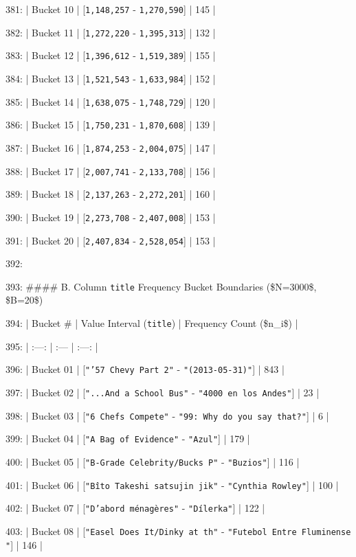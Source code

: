 \documentclass[11pt,a4paper]{article}
\begin{document}
381: | Bucket 10 | [\texttt{1,148,257} - \texttt{1,270,590}] | 145 |

382: | Bucket 11 | [\texttt{1,272,220} - \texttt{1,395,313}] | 132 |

383: | Bucket 12 | [\texttt{1,396,612} - \texttt{1,519,389}] | 155 |

384: | Bucket 13 | [\texttt{1,521,543} - \texttt{1,633,984}] | 152 |

385: | Bucket 14 | [\texttt{1,638,075} - \texttt{1,748,729}] | 120 |

386: | Bucket 15 | [\texttt{1,750,231} - \texttt{1,870,608}] | 139 |

387: | Bucket 16 | [\texttt{1,874,253} - \texttt{2,004,075}] | 147 |

388: | Bucket 17 | [\texttt{2,007,741} - \texttt{2,133,708}] | 156 |

389: | Bucket 18 | [\texttt{2,137,263} - \texttt{2,272,201}] | 160 |

390: | Bucket 19 | [\texttt{2,273,708} - \texttt{2,407,008}] | 153 |

391: | Bucket 20 | [\texttt{2,407,834} - \texttt{2,528,054}] | 153 |

392:

393: \#\#\#\# B. Column \texttt{title} Frequency Bucket Boundaries (\$N=3000\$, \$B=20\$)

394: | Bucket \# | Value Interval (\texttt{title}) | Frequency Count (\$n\_i\$) |

395: | :---: | :--- | :---: |

396: | Bucket 01 | [\texttt{"'57 Chevy Part 2"} - \texttt{"(2013-05-31)"}] | 843 |

397: | Bucket 02 | [\texttt{"...And a School Bus"} - \texttt{"4000 en los Andes"}] | 23 |

398: | Bucket 03 | [\texttt{"6 Chefs Compete"} - \texttt{"99: Why do you say that?"}] | 6 |

399: | Bucket 04 | [\texttt{"A Bag of Evidence"} - \texttt{"Azul"}] | 179 |

400: | Bucket 05 | [\texttt{"B-Grade Celebrity/Bucks P"} - \texttt{"Buzios"}] | 116 |

401: | Bucket 06 | [\texttt{"Bîto Takeshi satsujin jik"} - \texttt{"Cynthia Rowley"}] | 100 |

402: | Bucket 07 | [\texttt{"D'abord ménagères"} - \texttt{"Dílerka"}] | 122 |

403: | Bucket 08 | [\texttt{"Easel Does It/Dinky at th"} - \texttt{"Futebol Entre Fluminense "}] | 146 |
\end{document}
